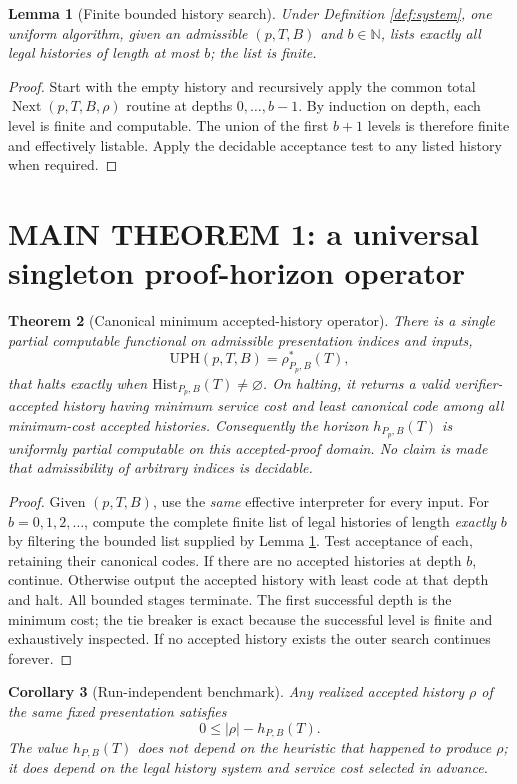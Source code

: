 \documentclass[11pt]{article}
\newtheorem{theorem}{Theorem}[section]
\newtheorem{corollary}[theorem]{Corollary}
\newtheorem{lemma}[theorem]{Lemma}
\theoremstyle{definition}
\newcommand{\Hist}{\mathrm{Hist}}
\newcommand{\bbN}{\mathbb{N}}
\begin{document}
\begin{lemma}[Finite bounded history search]\label{lem:finite}
Under Definition \ref{def:system}, one uniform algorithm, given an admissible $(p,T,B)$ and $b\in\bbN$, lists exactly all legal histories of length at most $b$; the list is finite.
\end{lemma}
\begin{proof}
Start with the empty history and recursively apply the common total $\operatorname{Next}(p,T,B,\rho)$ routine at depths $0,\ldots,b-1$. By induction on depth, each level is finite and computable. The union of the first $b+1$ levels is therefore finite and effectively listable. Apply the decidable acceptance test to any listed history when required.
\end{proof}

\section{MAIN THEOREM 1: a universal singleton proof-horizon operator}
\begin{theorem}[Canonical minimum accepted-history operator]\label{thm:canonical}
There is a \emph{single partial computable functional} on admissible presentation indices and inputs,
\[
\mathrm{UPH}(p,T,B)=\rho^*_{P_p,B}(T),
\]
that halts exactly when $\Hist_{P_p,B}(T)\ne\varnothing$. On halting, it returns a valid verifier-accepted history having minimum service cost and least canonical code among all minimum-cost accepted histories. Consequently the horizon $h_{P_p,B}(T)$ is uniformly partial computable on this accepted-proof domain. No claim is made that admissibility of arbitrary indices is decidable.
\end{theorem}
\begin{proof}
Given $(p,T,B)$, use the \emph{same} effective interpreter for every input. For $b=0,1,2,\ldots$, compute the complete finite list of legal histories of length \emph{exactly} $b$ by filtering the bounded list supplied by Lemma \ref{lem:finite}. Test acceptance of each, retaining their canonical codes. If there are no accepted histories at depth $b$, continue. Otherwise output the accepted history with least code at that depth and halt. All bounded stages terminate. The first successful depth is the minimum cost; the tie breaker is exact because the successful level is finite and exhaustively inspected. If no accepted history exists the outer search continues forever.
\end{proof}

\begin{corollary}[Run-independent benchmark]
Any realized accepted history $\rho$ of the same fixed presentation satisfies
\[
0\le |\rho|-h_{P,B}(T).
\]
The value $h_{P,B}(T)$ does not depend on the heuristic that happened to produce $\rho$; it \emph{does} depend on the legal history system and service cost selected in advance.
\end{corollary}
\end{document}
